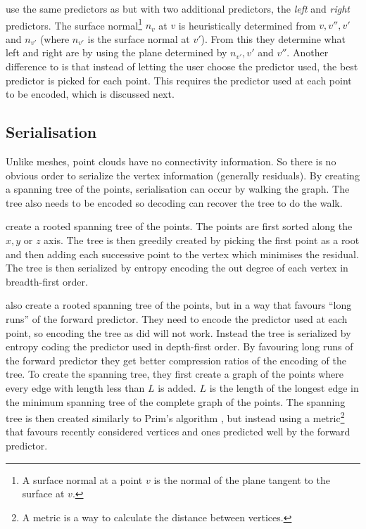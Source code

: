 \documentclass[a4paper]{report}
\begin{document}
\citet{merrycomp} use the same predictors as \citet{gumholdcomp} but with two
additional predictors, the \emph{left} and \emph{right} predictors. The
surface normal\footnote{A surface normal at a point $v$ is the normal of the
  plane tangent to the surface at $v$.} $n_v$ at $v$ is heuristically
determined from $v, v'', v'$ and $n_{v'}$ (where $n_{v'}$ is the surface
normal at $v'$). From this they determine what left and right are by using the
plane determined by $n_{v'}, v'$ and $v''$. Another difference to
\citet{gumholdcomp} is that instead of letting the user choose the
predictor used, the best predictor is picked for each point. This requires the
predictor used at each point to be encoded, which is discussed next.


\subsection{Serialisation}
\label{sec:serialisation}

Unlike meshes, point clouds have no connectivity information. So there is no
obvious order to serialize the vertex information (generally residuals). By
creating a spanning tree of the points, serialisation can occur by walking the
graph. The tree also needs to be encoded so decoding can recover the tree to
do the walk.

\citet{gumholdcomp} create a rooted spanning tree of the points. The points
are first sorted along the $x, y$ or $z$ axis. The tree is then greedily
created by picking the first point as a root and then adding each successive
point to the vertex which minimises the residual. The tree is then serialized
by entropy encoding the out degree of each vertex in breadth-first order.

\citet{merrycomp} also create a rooted spanning tree of the points, but in a
way that favours ``long runs'' of the forward predictor. They need to encode
the predictor used at each point, so encoding the tree as \citet{gumholdcomp}
did will not work. Instead the tree is serialized by entropy coding the
predictor used in depth-first order. By favouring long runs of the forward
predictor they get better compression ratios of the encoding of the tree. To
create the spanning tree, they first create a graph of the points where every
edge with length less than $L$ is added. $L$ is the length of the longest edge
in the minimum spanning tree of the complete graph of the points. The spanning
tree is then created similarly to Prim's algorithm \citep[p.\ 457]{sedgewick},
but instead using a metric\footnote{A metric is a way to calculate the
  distance between vertices.} that favours recently considered vertices and
ones predicted well by the forward predictor.
\end{document}
